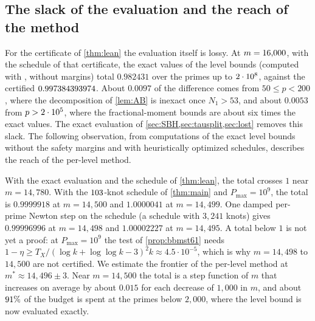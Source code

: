 \subsection{The slack of the evaluation and the reach of the method}\label{sec:reach}

For the certificate of \cref{thm:lean} the evaluation itself is lossy. At $m=16{,}000$, with the schedule of that
certificate, the exact values of the level bounds (computed with , without margins) total $0.982431$ over
the primes up to $2\cdot 10^{8}$, against the certified $0.997384393974$. About $0.0097$ of the difference comes from
$50\le p<200$, where the decomposition of \cref{lem:AB} is inexact once $N_1>53$, and about $0.0053$ from $p>2\cdot 10^{5}$,
where the fractional-moment bounds are about six times the exact values. The exact evaluation of
\cref{sec:SBH,sec:tausplit,sec:lost} removes this slack. The following observation, from computations of the exact
level bounds without the safety margins and with heuristically optimized schedules, describes the reach of the
per-level method.

\begin{observation}\label{obs:frontier}
With the exact evaluation and the schedule of \cref{thm:lean}, the total crosses $1$ near $m=14{,}780$. With the
$103$-knot schedule of \cref{thm:main} and $P_{\max}=10^9$, the total is $0.9999918$ at $m=14{,}500$ and
$1.0000041$ at $m=14{,}499$. One damped per-prime Newton step on the schedule (a schedule with $3{,}241$ knots)
gives $0.99996996$ at $m=14{,}498$ and $1.00002227$ at $m=14{,}495$. A total below $1$ is not
yet a proof: at $P_{\max}=10^9$ the test of \cref{prop:bbmst61} needs
$1-\eta\ge T_X/(\log k+\log\log k-3)^2k\approx4.5\cdot10^{-5}$, which is why $m=14{,}498$ to $14{,}500$ are not
certified. We estimate the frontier of the per-level method at $m^*\approx14{,}496\pm3$. Near $m=14{,}500$ the total is
a step function of $m$ that increases on average by about $0.015$ for each decrease of $1{,}000$ in $m$, and about
$91\%$ of the budget is spent at the primes below $2{,}000$, where the level bound is now evaluated
exactly.
\end{observation}

